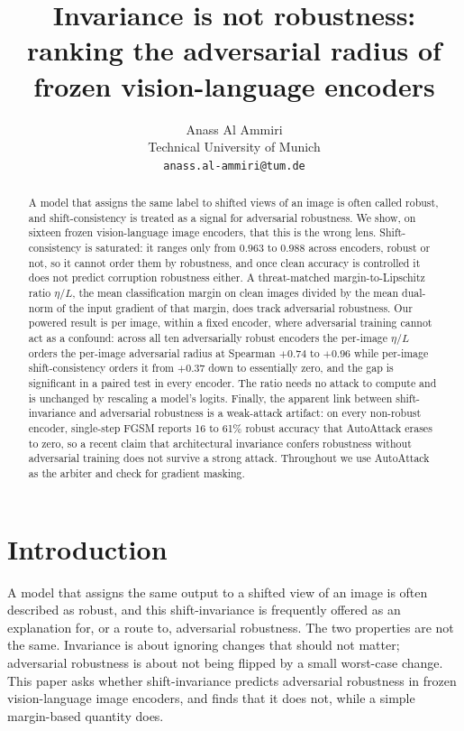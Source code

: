 \documentclass{article}
\title{Invariance is not robustness: ranking the adversarial radius of frozen vision-language encoders}
\author{Anass Al Ammiri\\
  Technical University of Munich\\
  \texttt{anass.al-ammiri@tum.de}}
\newcommand{\etaL}{\ensuremath{\eta/L}}
\begin{document}
\maketitle

\begin{abstract}
A model that assigns the same label to shifted views of an image is often called robust, and
shift-consistency is treated as a signal for adversarial robustness. We show, on sixteen frozen
vision-language image encoders, that this is the wrong lens. Shift-consistency is saturated: it ranges
only from $0.963$ to $0.988$ across encoders, robust or not, so it cannot order them by robustness, and
once clean accuracy is controlled it does not predict corruption robustness either. A threat-matched
margin-to-Lipschitz ratio \etaL{}, the mean classification margin on clean images divided by the mean
dual-norm of the input gradient of that margin, does track adversarial robustness. Our powered result
is per image, within a fixed encoder, where adversarial training cannot act as a confound: across all
ten adversarially robust encoders the per-image \etaL{} orders the per-image adversarial radius at
Spearman $+0.74$ to $+0.96$ while per-image shift-consistency orders it from $+0.37$ down to essentially
zero, and the gap is significant in a paired test in every encoder. The ratio needs no attack to
compute and is unchanged by rescaling a model's logits. Finally, the apparent link between
shift-invariance and adversarial robustness is a weak-attack artifact: on every non-robust encoder,
single-step FGSM reports 16 to 61\% robust accuracy that AutoAttack erases to zero, so a recent claim
that architectural invariance confers robustness without adversarial training does not survive a strong
attack. Throughout we use AutoAttack as the arbiter and check for gradient masking.
\end{abstract}

\section{Introduction}
\label{sec:intro}
A model that assigns the same output to a shifted view of an image is often described as robust, and
this shift-invariance is frequently offered as an explanation for, or a route to, adversarial
robustness. The two properties are not the same. Invariance is about ignoring changes that should not
matter; adversarial robustness is about not being flipped by a small worst-case change. This paper
asks whether shift-invariance predicts adversarial robustness in frozen vision-language image
encoders, and finds that it does not, while a simple margin-based quantity does.
\end{document}
